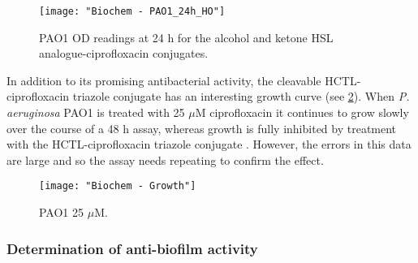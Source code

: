 \begin{figure}[H]
	\begin{center}
		\texttt{[image: "Biochem - PAO1\_24h\_HO"]}
		\caption{PAO1 OD readings at 24 h for the alcohol and ketone HSL analogue-ciprofloxacin conjugates.\label{fgr:PAO1_24h_HO}}
	\end{center}
\end{figure}

%
%
%
%
%

In addition to its promising antibacterial activity, the cleavable HCTL-ciprofloxacin triazole conjugate  has an interesting growth curve (see \ref{fgr:growth}).
When \textit{P. aeruginosa} PAO1 is treated with 25 $\mu$M ciprofloxacin  it continues to grow slowly over the course of a 48 h assay, whereas growth is fully inhibited by treatment with the HCTL-ciprofloxacin triazole conjugate . However, the errors in this data are large and so the assay needs repeating to confirm the effect.

\begin{figure}[H]
	\begin{center}
		\texttt{[image: "Biochem - Growth"]}
		\caption{PAO1 25 $\mu$M.\label{fgr:growth}}
	\end{center}
\end{figure}

\subsubsection{Determination of anti-biofilm activity}

